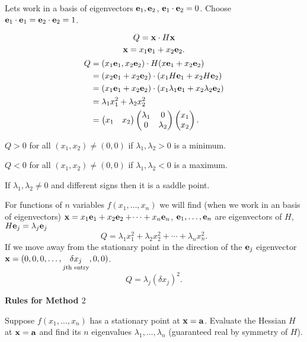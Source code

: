 \documentclass[10pt, a4paper]{article}
\begin{document}
Lets work in a basis of eigenvectors $\mathbf{e}_1, \mathbf{e}_2$,
$\mathbf{e}_1 \cdot \mathbf{e}_2 = 0$.
Choose $\mathbf{e}_1 \cdot \mathbf{e}_1 = \mathbf{e}_2 \cdot \mathbf{e}_2 = 1$.

\[
Q = \mathbf{x} \cdot H\mathbf{x}
\]
\[
\mathbf{x} = x_1\mathbf{e}_1 + x_2\mathbf{e}_2.
\]
\begin{align*}
    Q &= (x_1\mathbf{e}_1, x_2\mathbf{e}_2) \cdot H(x\mathbf{e}_1 + x_2\mathbf{e}_2) \\
    &= (x_2\mathbf{e}_1 + x_2\mathbf{e}_2) \cdot (x_1H\mathbf{e}_1 + x_2H\mathbf{e}_2) \\
    &= (x_1\mathbf{e}_1 + x_2\mathbf{e}_2) \cdot (x_1\lambda_1\mathbf{e}_1 + x_2\lambda_2\mathbf{e}_2) \\
    &= \lambda_1x_1 ^ 2 + \lambda_2x_2 ^ 2 \\
    &= \begin{pmatrix}
        x_1 & x_2
    \end{pmatrix}\begin{pmatrix}
        \lambda_1 & 0 \\
        0 & \lambda_2
    \end{pmatrix}\begin{pmatrix}
        x_1 \\ x_2
    \end{pmatrix}.
\end{align*}

$Q > 0$ for all $(x_1, x_2) \neq (0, 0)$ if $\lambda_1, \lambda_2 > 0$ is a minimum.

$Q < 0$ for all $(x_1, x_2) \neq (0, 0)$ if $\lambda_1, \lambda_2 < 0$ is a maximum.

If $\lambda_1, \lambda_2 \neq 0$ and different signs then it is a saddle point.

For functions of $n$ variables $f(x_1, \dotsc, x_n)$ we will find
(when we work in an basis of eigenvectors)
$\mathbf{x} = x_1\mathbf{e}_1 + x_2\mathbf{e}_2 + \dotsi + x_n\mathbf{e}_n$,
$\mathbf{e}_1, \dotsc, \mathbf{e}_n$ are eigenvectors of $H$,
$H\mathbf{e}_j = \lambda_j\mathbf{e}_j$
\[
Q = \lambda_1x_1 ^ 2 + \lambda_2x_2 ^ 2 + \dotsi + \lambda_nx_n ^ 2.
\]
If we move away from the stationary point in the direction of the $\mathbf{e}_j$ eigenvector $\mathbf{x} = (0, 0, 0, \dotsc, \underset{\text{$j$th entry}}{\delta x_j}, 0, 0)$.
\[
Q = \lambda_j(\delta x_j) ^ 2.
\]

\textbf{Rules for Method $2$}

Suppose $f(x_1, \dotsc, x_n)$ has a stationary point at $\mathbf{x} = \mathbf{a}$.
Evaluate the Hessian $H$ at $\mathbf{x} = \mathbf{a}$ and find its $n$ eigenvalues $\lambda_1, \dotsc, \lambda_n$
(guaranteed real by symmetry of $H$).
\end{document}
